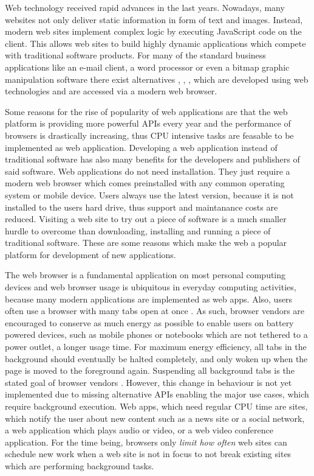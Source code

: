 \documentclass[
	ruledheaders=section,%
	class=report,%
	thesis={type=bachelor},%
	accentcolor=9c,%
	custommargins=true,%
	marginpar=false,%
	parskip=half-,%
	fontsize=11pt,%
]{tudapub}
\begin{document}
Web technology received rapid advances in the last years. Nowadays, many websites not only deliver static information in form of text and images. Instead, modern web sites implement complex logic by executing JavaScript code on the client. This allows web sites to build highly dynamic applications which compete with traditional software products. For many of the standard business applications like an e-mail client, a word processor or even a bitmap graphic manipulation software there exist alternatives \cite{gmail}, \cite{office365-online}, \cite{photopea}, which are developed using web technologies and are accessed via a modern web browser.

Some reasons for the rise of popularity of web applications are that the web platform is providing more powerful APIs every year and the performance of browsers is drastically increasing, thus CPU intensive tasks are feasable to be implemented as web application. Developing a web application instead of traditional software has also many benefits for the developers and publishers of said software. Web applications do not need installation. They just require a modern web browser which comes preinstalled with any common operating system or mobile device. Users always use the latest version, because it is not installed to the users hard drive, thus support and maintanance costs are reduced. Visiting a web site to try out a piece of software is a much smaller hurdle to overcome than downloading, installing and running a piece of traditional software. These are some reasons which make the web a popular platform for development of new applications.

The web browser is a fundamental application on most personal computing devices and web browser usage is ubiquitous in everyday computing activities, because many modern applications are implemented as web apps. Also, users often use a browser with many tabs open at once \cite{weinreich2008not}. As such, browser vendors are encouraged to conserve as much energy as possible to enable users on battery powered devices, such as mobile phones or notebooks which are not tethered to a power outlet, a longer usage time. For maximum energy efficiency, all tabs in the background should eventually be halted completely, and only woken up when the page is moved to the foreground again. Suspending all background tabs is the stated goal of browser vendors \cite{chrome-background-tabs-roadmap}. However, this change in behaviour is not yet implemented due to missing alternative APIs enabling the major use cases, which require background execution. Web apps, which need regular CPU time are sites, which notify the user about new content such as a news site or a social network, a web application which plays audio or video, or a web video conference application. For the time being, browsers only \textit{limit how often} web sites can schedule new work when a web site is not in focus to not break existing sites which are performing background tasks.
\end{document}
